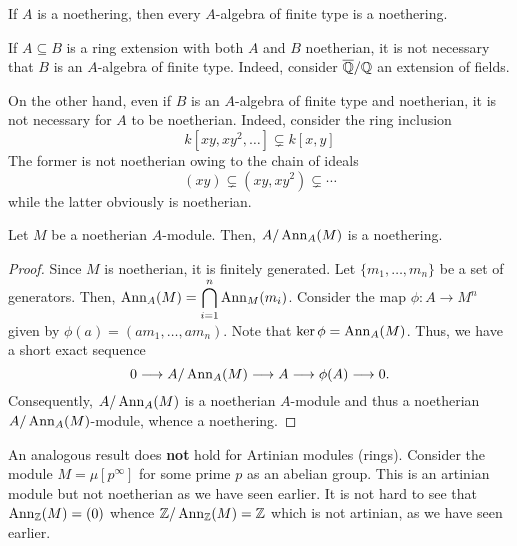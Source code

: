\begin{corollary}
    If $A$ is a noethering, then every $A$-algebra of finite type is a noethering.
\end{corollary}

If $A\subseteq B$ is a ring extension with both $A$ and $B$ noetherian, it is not necessary that $B$ is an $A$-algebra of finite type. Indeed, consider $\overline{\mathbb{Q}}/\mathbb{Q}$ an extension of fields.

On the other hand, even if $B$ is an $A$-algebra of finite type and noetherian, it is not necessary for $A$ to be noetherian. Indeed, consider the ring inclusion 
\begin{equation*}
    k[xy,xy^2,\ldots]\subsetneq k[x,y]
\end{equation*}
The former is not noetherian owing to the chain of ideals 
\begin{equation*}
    (xy)\subsetneq(xy,xy^2)\subsetneq\cdots
\end{equation*}
while the latter obviously is noetherian.

\begin{proposition}
    Let $M$ be a noetherian $A$-module. Then, $A/\operatorname{Ann}_A(M)$ is a noethering.
\end{proposition}
\begin{proof}
    Since $M$ is noetherian, it is finitely generated. Let $\{m_1,\ldots,m_n\}$ be a set of generators. Then, $\displaystyle\operatorname{Ann}_A(M) = \bigcap_{i = 1}^n\operatorname{Ann}_M(m_i)$. Consider the map $\phi: A\to M^n$ given by $\phi(a) = (am_1,\ldots,am_n)$. Note that $\ker\phi = \operatorname{Ann}_A(M)$. Thus, we have a short exact sequence 
    \begin{equation*}
        0\longrightarrow A/\operatorname{Ann}_A(M)\longrightarrow A\longrightarrow\phi(A)\longrightarrow 0.
    \end{equation*}
    Consequently, $A/\operatorname{Ann}_A(M)$ is a noetherian $A$-module and thus a noetherian $A/\operatorname{Ann}_A(M)$-module, whence a noethering.
\end{proof}

An analogous result does \textbf{not} hold for Artinian modules (rings). Consider the module $M = {\mu}[p^\infty]$ for some prime $p$ as an abelian group. This is an artinian module but not noetherian as we have seen earlier. It is not hard to see that $\operatorname{Ann}_{\mathbb{Z}}(M) = (0)$ whence $\mathbb{Z}/\operatorname{Ann}_{\mathbb{Z}}(M) = \mathbb{Z}$ which is not artinian, as we have seen earlier.


